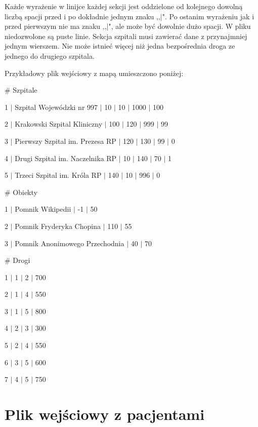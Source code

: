 \documentclass[10pt,a4paper]{article}
\begin{document}
Każde wyrażenie w linijce każdej sekcji jest oddzielone od kolejnego dowolną liczbą spacji przed i po dokładnie jednym znaku ,,$\mid$". Po ostanim wyrażeniu jak i przed pierwszym nie ma znaku ,,$\mid$", ale może być dowolnie dużo spacji. W pliku niedozwolone są puste linie. Sekcja szpitali musi zawierać dane z przynajmniej jednym wierszem. Nie może istnieć więcej niż jedna bezpośrednia droga ze jednego do drugiego szpitala.

Przykładowy plik wejściowy z mapą umieszczono poniżej:
\begin{description}[style=multiline,leftmargin=3cm]
\item \# Szpitale
\item 1 $\mid$ Szpital Wojewódzki nr 997 $\mid$ 10 $\mid$ 10 $\mid$ 1000 $\mid$ 100
\item 2 $\mid$ Krakowski Szpital Kliniczny $\mid$ 100 $\mid$ 120 $\mid$ 999 $\mid$ 99
\item 3 $\mid$ Pierwszy Szpital im. Prezesa RP $\mid$ 120 $\mid$ 130 $\mid$ 99 $\mid$ 0
\item 4 $\mid$ Drugi Szpital im. Naczelnika RP $\mid$ 10 $\mid$ 140 $\mid$ 70 $\mid$ 1
\item 5 $\mid$ Trzeci Szpital im. Króla RP $\mid$ 140 $\mid$ 10 $\mid$ 996 $\mid$ 0
\item \# Obiekty 
\item 1 $\mid$ Pomnik Wikipedii $\mid$ -1 $\mid$ 50
\item 2 $\mid$ Pomnik Fryderyka Chopina $\mid$ 110 $\mid$ 55
\item 3 $\mid$ Pomnik Anonimowego Przechodnia $\mid$ 40 $\mid$ 70
\item \# Drogi
\item 1 $\mid$ 1 $\mid$ 2 $\mid$ 700
\item 2 $\mid$ 1 $\mid$ 4 $\mid$ 550
\item 3 $\mid$ 1 $\mid$ 5 $\mid$ 800
\item 4 $\mid$ 2 $\mid$ 3 $\mid$ 300
\item 5 $\mid$ 2 $\mid$ 4 $\mid$ 550
\item 6 $\mid$ 3 $\mid$ 5 $\mid$ 600
\item 7 $\mid$ 4 $\mid$ 5 $\mid$ 750
\end{description}

\section{Plik wejściowy z pacjentami}
\end{document}

